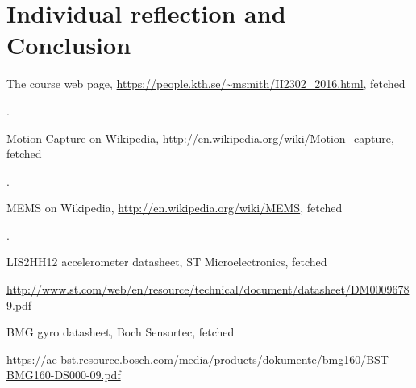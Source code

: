 \documentclass[a4paper, 12pt]{article}
\begin{document}
\section*{Individual reflection and Conclusion}




\begin{thebibliography}{7}

	The course web page,
	\url{https://people.kth.se/~msmith/II2302\_2016.html}, fetched \date{\today{}}.

	Motion Capture on Wikipedia,
	\url{http://en.wikipedia.org/wiki/Motion\_capture}, fetched \date{\today{}}.

	MEMS on Wikipedia,
	\url{http://en.wikipedia.org/wiki/MEMS}, fetched \date{\today{}}.


        LIS2HH12 accelerometer datasheet, ST Microelectronics, fetched \date{\today{}}
        \url{http://www.st.com/web/en/resource/technical/document/datasheet/DM00096789.pdf}
	
        BMG gyro datasheet, Boch Sensortec, fetched \date{\today{}}
        \url{https://ae-bst.resource.bosch.com/media/products/dokumente/bmg160/BST-BMG160-DS000-09.pdf}
	

\end{thebibliography}
\end{document}
